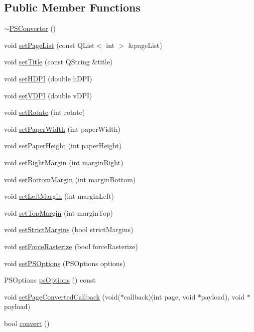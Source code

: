 \subsection*{Public Member Functions}
\begin{DoxyCompactItemize}
\item 
\hyperlink{class_poppler_1_1_p_s_converter_a8065c6cbe3b926a69fba4ded23c0246a}{$\sim$\+P\+S\+Converter} ()
\item 
void \hyperlink{class_poppler_1_1_p_s_converter_ab1b834475ed943018c56843cfede95b7}{set\+Page\+List} (const Q\+List$<$ int $>$ \&page\+List)
\item 
void \hyperlink{class_poppler_1_1_p_s_converter_aa88fc3e34646758809472acee3987624}{set\+Title} (const Q\+String \&title)
\item 
void \hyperlink{class_poppler_1_1_p_s_converter_ad91c3171f4d97e7fc43bb06edc4fb9b1}{set\+H\+D\+PI} (double h\+D\+PI)
\item 
void \hyperlink{class_poppler_1_1_p_s_converter_a77d7cb4807c5b1661e2483927ae9954d}{set\+V\+D\+PI} (double v\+D\+PI)
\item 
void \hyperlink{class_poppler_1_1_p_s_converter_ae17b403bf29c0123477b816fd9d8662c}{set\+Rotate} (int rotate)
\item 
void \hyperlink{class_poppler_1_1_p_s_converter_ae110aaa5e605065d65097769dd970045}{set\+Paper\+Width} (int paper\+Width)
\item 
void \hyperlink{class_poppler_1_1_p_s_converter_aa06d1f5965ba68bd7ee5b90828fd515f}{set\+Paper\+Height} (int paper\+Height)
\item 
void \hyperlink{class_poppler_1_1_p_s_converter_a406eebb20d93933b9b4499d6848d9808}{set\+Right\+Margin} (int margin\+Right)
\item 
void \hyperlink{class_poppler_1_1_p_s_converter_a45373befaea228d0a961f9327f0e27bf}{set\+Bottom\+Margin} (int margin\+Bottom)
\item 
void \hyperlink{class_poppler_1_1_p_s_converter_a8062eaac0b2cfdc4930c6f39593abc9a}{set\+Left\+Margin} (int margin\+Left)
\item 
void \hyperlink{class_poppler_1_1_p_s_converter_a59403e5586a27c147885ca1cb03e2fa5}{set\+Top\+Margin} (int margin\+Top)
\item 
void \hyperlink{class_poppler_1_1_p_s_converter_a27a0d7c675d881f4932e0f330da49a04}{set\+Strict\+Margins} (bool strict\+Margins)
\item 
void \hyperlink{class_poppler_1_1_p_s_converter_aca8e393fa509c2cfe7302b8ddc5b1b62}{set\+Force\+Rasterize} (bool force\+Rasterize)
\item 
void \hyperlink{class_poppler_1_1_p_s_converter_a11268ce2b1f53480accb3782ab070e2a}{set\+P\+S\+Options} (P\+S\+Options options)
\item 
P\+S\+Options \hyperlink{class_poppler_1_1_p_s_converter_ac52aec45730a525c2f4f7d9d142815ac}{ps\+Options} () const
\item 
void \hyperlink{class_poppler_1_1_p_s_converter_a3cdcdc3ed5cebb1f69e80c66d08b5948}{set\+Page\+Converted\+Callback} (void($\ast$callback)(int page, void $\ast$payload), void $\ast$payload)
\item 
bool \hyperlink{class_poppler_1_1_p_s_converter_a106cc524ec1d73ab7f6bbb6cf1deede9}{convert} ()
\end{DoxyCompactItemize}
